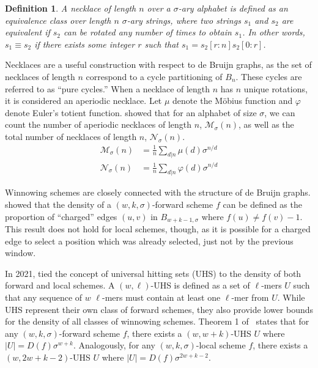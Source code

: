 \documentclass{article}
\newtheorem{definition}{Definition}[section]
\begin{document}
\begin{definition}
A necklace of length $n$ over a $\sigma$-ary alphabet is defined as an equivalence class over length $n$ $\sigma$-ary strings, where two strings $s_1$ and $s_2$ are equivalent if $s_2$ can be rotated any number of times to obtain $s_1$. In other words, $s_1\equiv s_2$ if there exists some integer $r$ such that $s_1 = s_2[r : n]s_2[0 : r]$. 
\end{definition}

Necklaces are a useful construction with respect to de Bruijn graphs, as the set of necklaces of length $n$ correspond to a cycle partitioning of $B_n$. These cycles are referred to as ``pure cycles.'' When a necklace of length $n$ has $n$ unique rotations, it is considered an aperiodic necklace. Let $\mu$ denote the M\"{o}bius function and $\varphi$ denote Euler's totient function. \cite{moreau1872permutations} showed that for an alphabet of size $\sigma$, we can count the number of aperiodic necklaces of length $n$, $\mathcal{M}_\sigma(n)$, as well as the total number of necklaces of length $n$, $\mathcal{N}_\sigma(n)$. 
\begin{align*}
    \mathcal{M}_\sigma(n)&=\frac{1}{n}\sum_{d|n}\mu(d)\sigma^{{n}/{d}}\\
    \mathcal{N}_\sigma(n)&=\frac{1}{n}\sum_{d|n}\varphi(d)\sigma^{{n}/{d}}
\end{align*}

Winnowing schemes are closely connected with the structure of de Bruijn graphs. \citep{marccais2017improving} showed that the density of a $(w, k, \sigma)$-forward scheme $f$ can be defined as the proportion of ``charged'' edges $(u, v)$ in $B_{w+k-1, \sigma}$ where $f(u) \neq f(v)-1$. This result does not hold for local schemes, though, as it is possible for a charged edge to select a position which was already selected, just not by the previous window.

In 2021, \cite{zheng2021lower} tied the concept of universal hitting sets (UHS) to the density of both forward and local schemes. A $(w, \ell)$-UHS is defined as a set of $\ell$-mers $U$ such that any sequence of $w$ $\ell$-mers must contain at least one $\ell$-mer from $U$. While UHS represent their own class of forward schemes, they also provide lower bounds for the density of all classes of winnowing schemes. Theorem 1 of~\cite{zheng2021lower} states that for any $(w,k,\sigma)$-forward scheme $f$, there exists a $(w, w+k)$-UHS $U$ where $|U|=D(f)\sigma^{w+k}$. Analogously, for any $(w,k,\sigma)$-local scheme $f$, there exists a $(w, 2w+k-2)$-UHS $U$ where $|U|=D(f)\sigma^{2w+k-2}$. 
\end{document}
